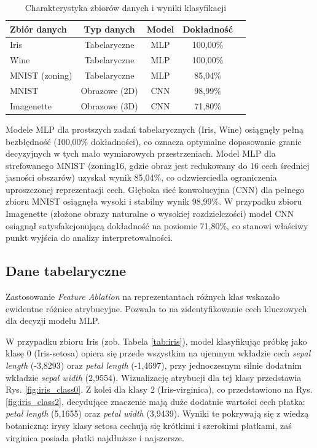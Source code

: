 \documentclass[10pt,journal,compsoc]{IEEEtran}
\begin{document}
\begin{table}[htbp]
\caption{Charakterystyka zbiorów danych i wyniki klasyfikacji}
\label{tab:datasets}
\begin{center}
\begin{tabular}{|l|c|c|c|c|}
\hline
\textbf{Zbiór danych} & \textbf{Typ danych} & \textbf{Model} & \textbf{Dokładność} \\
\hline
Iris & Tabelaryczne & MLP & 100,00\% \\
Wine & Tabelaryczne & MLP & 100,00\% \\
MNIST (zoning) & Tabelaryczne & MLP & 85,04\% \\
MNIST & Obrazowe (2D) & CNN & 98,99\% \\
Imagenette & Obrazowe (3D) & CNN & 71,80\% \\
\hline
\end{tabular}
\end{center}
\end{table}

Modele MLP dla prostszych zadań tabelarycznych (Iris, Wine) osiągnęły pełną bezbłędność (100,00\% dokładności), co oznacza optymalne dopasowanie granic decyzyjnych w tych mało wymiarowych przestrzeniach. Model MLP dla strefowanego MNIST (zoning16, gdzie obraz jest redukowany do 16 cech średniej jasności obszarów) uzyskał wynik 85,04\%, co odzwierciedla ograniczenia uproszczonej reprezentacji cech. Głęboka sieć konwolucyjna (CNN) dla pełnego zbioru MNIST osiągnęła wysoki i stabilny wynik 98,99\%. W przypadku zbioru Imagenette (złożone obrazy naturalne o wysokiej rozdzielczości) model CNN osiągnął satysfakcjonującą dokładność na poziomie 71,80\%, co stanowi właściwy punkt wyjścia do analizy interpretowalności.

\subsection{Dane tabelaryczne}
Zastosowanie \textit{Feature Ablation} na reprezentantach różnych klas wskazało ewidentne różnice atrybucyjne. Pozwala to na zidentyfikowanie cech kluczowych dla decyzji modelu MLP.

W przypadku zbioru Iris (zob. Tabela \ref{tab:iris}), model klasyfikując próbkę jako klasę 0 (Iris-setosa) opiera się przede wszystkim na ujemnym wkładzie cech \textit{sepal length} (-3,8293) oraz \textit{petal length} (-1,4697), przy jednoczesnym silnie dodatnim wkładzie \textit{sepal width} (2,9554). Wizualizację atrybucji dla tej klasy przedstawia Rys. \ref{fig:iris_class0}. Z kolei dla klasy 2 (Iris-virginica), co przedstawiono na Rys. \ref{fig:iris_class2}, decydujące znaczenie mają duże dodatnie wartości cech płatka: \textit{petal length} (5,1655) oraz \textit{petal width} (3,9439). Wyniki te pokrywają się z wiedzą botaniczną: irysy klasy setosa cechują się krótkimi i szerokimi płatkami, zaś virginica posiada płatki najdłuższe i najszersze.
\end{document}
